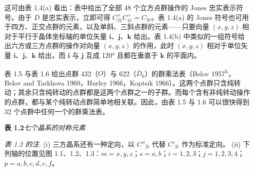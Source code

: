 这可由表 1.4(a) 看出：表中给出了全部 48 个立方点群操作的 Jones 忠实表示符号。由于 $D$ 是忠实表示，立即可得 $C_{31}^{+}C_{4z}^{+} = C_{2c}$。表 1.4(a) 的 Jones 符号也可用于四方、正交点群的元素，以及单斜、三斜点群的元素——只要向量 $(x, y, z)$ 相对于平行于晶体坐标轴的单位矢量 $\mathbf{i}$、$\mathbf{j}$、$\mathbf{k}$ 给出。表 1.4(b) 中类似的一组符号给出六方或三方点群的操作对向量 $(x, y, z)$ 的作用，此时 $(x, y, z)$ 相对于单位矢量 $\mathbf{i}$、$\mathbf{j}$、$\mathbf{k}$ 给出，而 $\mathbf{i}$ 与 $\mathbf{j}$ 互成 120° 且都在垂直于 $\mathbf{k}$ 的平面内。

表 1.5 与表 1.6 给出点群 432（$O$）与 622（$D_{6}$）的群乘法表（Belov 1957\textsuperscript{b}，Belov and Tarkhova 1960，Hurley 1966，Koptsik 1966）。这两个点群只含纯转动；其余只含纯转动的点群都是这两个点群之一的子群。而每个含有非纯转动操作的点群，都与某个纯转动点群简单地相关联。因此，由表 1.5 与 1.6 可以很快得到 32 个点群中任何一个的群乘法表。

\begin{table}[H]
\centering
\textbf{表 1.2}\quad \textit{七个晶系的对称元素}

\medskip
{}

\smallskip
\parbox{0.92\textwidth}{\textit{表 1.2 的注.}
(i) 三方晶系还有一种定向，以 $C''_{2i}$ 代替 $C'_{2i}$ 作为标准定向。
(ii) 下列轴的位置见图 1.1、1.2、1.3：$m = x, y, z$；$s = a, b$；$i = 1, 2, 3$；$j = 1, 2, 3, 4$；$p = a, b, c, d, e, f$。}
\end{table}


